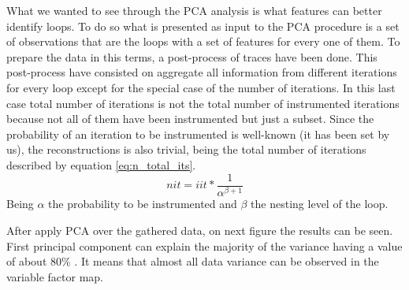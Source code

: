 What we wanted to see through the PCA analysis is what features can better
identify loops. To do so what is presented as input to the PCA procedure is a
set of observations that are the loops with a set of features for every one of
them. To prepare the data in this terms, a post-process of traces have been
done. This post-process have consisted on aggregate all information from different
iterations for every loop except for the special case of the number of iterations. 
In this last case total number of iterations is not the
total number of instrumented iterations because not all of them have been
instrumented but just a subset. Since the probability of an iteration to be
instrumented is well-known (it has been set by us), the reconstructions is also
trivial, being the total number of iterations described by equation
\ref{eq:n_total_its}.
\begin{equation}
  \label{eq:n_total_its}
  nit = iit*\frac{1}{\alpha^{\beta+1}}
\end{equation}
Being $\alpha$ the probability to be instrumented and $\beta$ the nesting level
of the loop.

After apply PCA over the gathered data, on next figure the
results can be seen. First principal component can explain the majority of the 
variance having a value of about 80\% . It means that almost all data variance 
can be observed in the variable factor map. 


